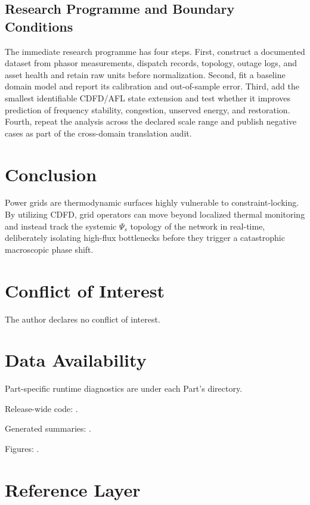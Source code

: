 \documentclass[11pt,a4paper]{article}
\begin{document}
\subsection{Research Programme and Boundary Conditions}

The immediate research programme has four steps. First, construct a documented
dataset from phasor measurements, dispatch records, topology, outage logs, and asset health and retain raw units before normalization.
Second, fit a baseline domain model and report its calibration and out-of-sample
error. Third, add the smallest identifiable CDFD/AFL state extension and test
whether it improves prediction of frequency stability, congestion, unserved energy, and restoration. Fourth, repeat the
analysis across the declared scale range and publish negative cases as part of
the cross-domain translation audit.


\section{Conclusion}
Power grids are thermodynamic surfaces highly vulnerable to constraint-locking. By utilizing CDFD, grid operators can move beyond localized thermal monitoring and instead track the systemic $\Psi_s$ topology of the network in real-time, deliberately isolating high-flux bottlenecks before they trigger a catastrophic macroscopic phase shift.
\section*{Conflict of Interest} The author declares no conflict of interest.
\section*{Data Availability}
Part-specific runtime diagnostics are under each Part's  directory.

Release-wide code: .

Generated summaries: .

Figures: .


\section{Reference Layer}


\end{document}
